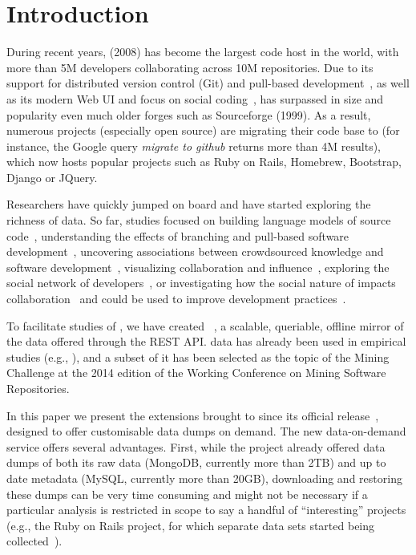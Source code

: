 
\section{Introduction}
\label{sec:intro}

During recent years, \gh (2008) has become the largest code host in the world, with more than 5M developers
collaborating across 10M repositories.
Due to its support for distributed version control (Git) and pull-based development~\cite{barr2012cohesive}, 
as well as its modern Web UI and focus on social coding~\cite{dabbish2012social}, \gh has surpassed in size
and popularity even much older forges such as Sourceforge (1999).
As a result, numerous projects (especially open source) are migrating their code base to \gh (for instance, 
the Google query \emph{migrate to github} returns more than 4M results), which now hosts popular projects
such as Ruby on Rails, Homebrew, Bootstrap, Django or JQuery.

Researchers have quickly jumped on board and have started exploring the richness of \gh data.
So far, studies focused on 
building language models of source code~\cite{allamanis2013mining}, 
understanding the effects of branching and pull-based software development~\cite{lee2013git, gousios2014exploratory}, 
uncovering associations between crowdsourced knowledge and software development~\cite{vasilescu2013stackoverflow},
visualizing collaboration and influence~\cite{heller2011visualizing}, 
exploring the social network of developers~\cite{thung2013network, schall2013follow, jiang2013understanding},
or investigating how the social nature of \gh impacts collaboration~\cite{dabbish2012social, marlow2013impression}
and could be used to improve development practices~\cite{pham2013creating, pham2013building}.

To facilitate studies of \gh, we have created \ght~\cite{gousios2012ghtorrent, gousios2013ghtorent}, a scalable, 
queriable, offline mirror of the data offered through the \gh REST API.
\ght data has already been used in empirical studies (e.g., \cite{gousios2014exploratory, squire2014forge, 
vasilescu2013stackoverflow}), and a subset of it has been selected as the topic of the Mining Challenge
at the 2014 edition of the Working Conference on Mining Software Repositories.

In this paper we present the extensions brought to \ght since its official release~\cite{gousios2013ghtorent},
designed to offer customisable data dumps on demand.
The new \ght data-on-demand service offers several advantages.
First, while the \ght project already offered data dumps of both its raw data (MongoDB, currently more than 2TB) 
and up to date metadata (MySQL, currently more than 20GB), downloading and restoring these dumps can be 
very time consuming and might not be necessary if a particular analysis is restricted in scope to say a handful
of ``interesting'' \gh projects (e.g., the Ruby on Rails project, for which separate data sets started being 
collected~\cite{wagstrom2013network}).

